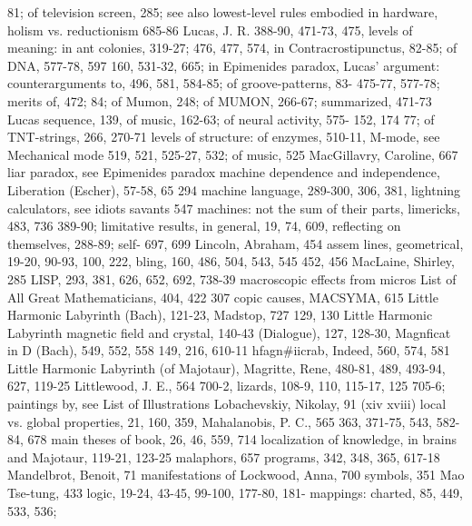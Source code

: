 81; of television screen, 285; see also        lowest-level rules embodied in hardware,
holism vs. reductionism                        685-86 Lucas, J. R. 388-90, 471-73, 475,
levels of meaning: in ant colonies, 319-27;    476, 477, 574,
in Contracrostipunctus, 82-85; of DNA,         577-78, 597
160, 531-32, 665; in Epimenides paradox,       Lucas' argument: counterarguments to,
496, 581, 584-85; of groove-patterns, 83-      475-77, 577-78; merits of, 472;
84; of Mumon, 248; of MUMON, 266-67;           summarized, 471-73 Lucas sequence, 139,
of music, 162-63; of neural activity, 575-     152, 174
77; of TNT-strings, 266, 270-71
levels of structure: of enzymes, 510-11,       M-mode, see Mechanical mode
519, 521, 525-27, 532; of music, 525           MacGillavry, Caroline, 667
liar paradox, see Epimenides paradox           machine dependence and independence,
Liberation (Escher), 57-58, 65                 294 machine language, 289-300, 306, 381,
lightning calculators, see idiots savants      547 machines: not the sum of their parts,
limericks, 483, 736                            389-90;
limitative results, in general, 19, 74, 609,   reflecting on themselves, 288-89; self-
697, 699 Lincoln, Abraham, 454                 assem
lines, geometrical, 19-20, 90-93, 100, 222,    bling, 160, 486, 504, 543, 545
452, 456                                       MacLaine, Shirley, 285
LISP, 293, 381, 626, 652, 692, 738-39          macroscopic effects from micros
List of All Great Mathematicians, 404, 422     307     copic causes, MACSYMA, 615
Little Harmonic Labyrinth (Bach), 121-23,      Madstop, 727
129, 130 Little Harmonic Labyrinth             magnetic field and crystal, 140-43
(Dialogue), 127, 128-30,                       Magnficat in D (Bach), 549, 552, 558
149, 216, 610-11                               hfagn\#iicrab, Indeed, 560, 574, 581
Little Harmonic Labyrinth (of Majotaur),       Magritte, Rene, 480-81, 489, 493-94, 627,
119-25 Littlewood, J. E., 564                  700-2,
lizards, 108-9, 110, 115-17, 125               705-6; paintings by, see List of Illustrations
Lobachevskiy, Nikolay, 91                      (xiv xviii)
local vs. global properties, 21, 160, 359,     Mahalanobis, P. C., 565
363, 371-75, 543, 582-84, 678                  main theses of book, 26, 46, 559, 714
localization of knowledge, in brains and       Majotaur, 119-21, 123-25 malaphors, 657
programs, 342, 348, 365, 617-18                Mandelbrot, Benoit, 71 manifestations of
Lockwood, Anna, 700                            symbols, 351 Mao Tse-tung, 433
logic, 19-24, 43-45, 99-100, 177-80, 181-      mappings: charted, 85, 449, 533, 536;
